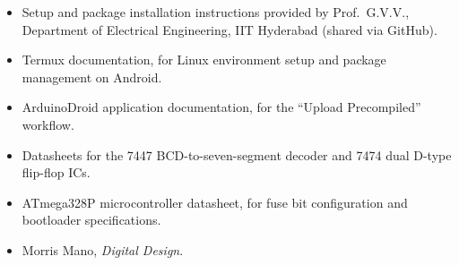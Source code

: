 \documentclass[12pt,a4paper]{report}
\begin{document}
\begin{itemize}
    \item Setup and package installation instructions provided by Prof.\ G.V.V., Department of Electrical Engineering, IIT Hyderabad (shared via GitHub).
    \item Termux documentation, for Linux environment setup and package management on Android.
    \item ArduinoDroid application documentation, for the ``Upload Precompiled'' workflow.
    \item Datasheets for the 7447 BCD-to-seven-segment decoder and 7474 dual D-type flip-flop ICs.
    \item ATmega328P microcontroller datasheet, for fuse bit configuration and bootloader specifications.
    \item Morris Mano, \textit{Digital Design}.
\end{itemize}
\end{document}

